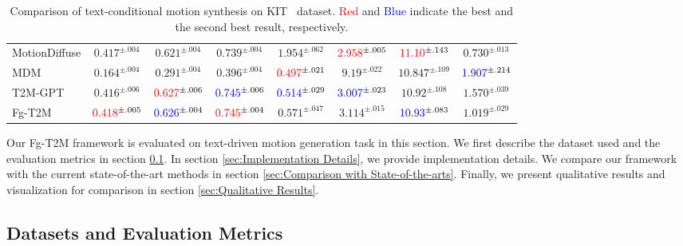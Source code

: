 \documentclass[10pt,twocolumn,letterpaper]{article}
\begin{document}
\begin{table}[t]
{\begin{tabular}{@{}lccccccc@{}}
MotionDiffuse \cite{zhang2022motiondiffuse}&
$0.417^{\pm.004}$ &
$0.621^{\pm.004}$ &
$0.739^{\pm.004}$ &
$1.954^{\pm.062}$ &
$\textcolor{red}{2.958}^{\pm.005}$ &
$\textcolor{red}{11.10}^{\pm.143}$ &
$0.730^{\pm.013}$ \\
MDM \cite{tevet2022human}&
$0.164^{\pm.004}$ &
$0.291^{\pm.004}$ &
$0.396^{\pm.004}$ &
$\textcolor{red}{0.497}^{\pm.021}$ &
$9.19^{\pm.022}$ &
$10.847^{\pm.109}$ &
$\textcolor{blue}{1.907}^{\pm.214}$ \\
T2M-GPT \cite{zhang2023t2m}&
$0.416^{\pm.006}$ &
$\textcolor{red}{0.627}^{\pm.006}$ &
$\textcolor{blue}{0.745}^{\pm.006}$ &
$\textcolor{blue}{0.514}^{\pm.029}$ &
$\textcolor{blue}{3.007}^{\pm.023}$ &
$10.92^{\pm.108}$ &
$1.570^{\pm.039}$ \\
\midrule
\midrule
Fg-T2M&
$\textcolor{red}{0.418}^{\pm.005}$ &
$\textcolor{blue}{0.626}^{\pm.004}$ &
$\textcolor{red}{0.745}^{\pm.004}$ &
$0.571^{\pm.047}$ &
$3.114^{\pm.015}$ &
$\textcolor{blue}{10.93}^{\pm.083}$ &
$1.019^{\pm.029}$ \\
\bottomrule
\end{tabular}}
\vspace{-6pt}
\caption{Comparison of text-conditional motion synthesis on KIT~\cite{plappert2016kit} dataset. \textcolor{red}{Red} and \textcolor{blue}{Blue} indicate the best and the second best result, respectively.}
\label{compare_kit}
\end{table}













Our Fg-T2M framework is evaluated on text-driven motion generation task in this section. We first describe the dataset used and the evaluation metrics in section \ref{sec:Datasets and Evaluation Metrics}. In section \ref{sec:Implementation Details}, we provide implementation details. We compare our framework with the current state-of-the-art methods in section  \ref{sec:Comparison with State-of-the-arts}. Finally, we present qualitative results and visualization for comparison in section \ref{sec:Qualitative Results}.

\subsection{Datasets and Evaluation Metrics}
\label{sec:Datasets and Evaluation Metrics}
\end{document}
